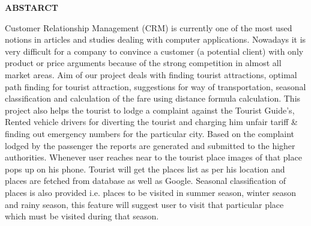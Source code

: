 \documentclass[12pt,a4paper]{article}
\begin{document}
\newpage
{}
\pagestyle{plain}           %
\begin{center}
\bf ABSTARCT
\end{center}
\hspace{0.7cm}Customer Relationship Management (CRM) is currently one of the most used notions in articles and studies dealing with computer applications. Nowadays it is very difficult for a company to convince a customer (a potential client) with only product or price arguments because of the strong competition in almost all market areas. Aim of our project deals with finding tourist attractions, optimal path finding for tourist attraction, suggestions for way of transportation, seasonal classification and calculation of the fare using distance formula calculation. This project also helps the tourist to lodge a complaint against the Tourist Guide’s, Rented vehicle drivers for diverting the tourist and charging him unfair tariff & finding out emergency numbers for the particular city. Based on the complaint lodged by the passenger the reports are generated and submitted to the higher authorities. Whenever user reaches near to the tourist place images of that place pops up on his phone. Tourist will get the places list as per his location and places are fetched from database as well as Google. Seasonal classification of places is also provided i.e. places to be visited in summer season, winter season and rainy season, this feature will suggest user to visit that particular place which must be visited during that season.

\\

\newpage
{\setlength{\baselineskip}{1.5\baselineskip}
\tableofcontents
}

\newpage
{\setlength{\baselineskip}{1.5\baselineskip}
\listoftables
{}
}


\newpage
{\setlength{\baselineskip}{1.5\baselineskip}
\listoffigures
{}
}

\end{document}
